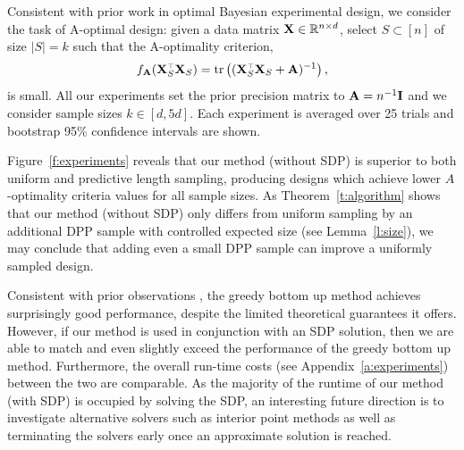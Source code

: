Consistent with prior work \citep{mariet2017elementary,chaloner1984optimal}
in optimal Bayesian experimental design,
we consider the task of A-optimal design:
given a data matrix $\mathbf X \in \mathbb R^{n \times d}$, select
$S \subset [n]$ of size $\lvert S \rvert = k$ such that
the A-optimality
criterion,
\[f_{\A}(\X_S^\top \X_S) = \tr \left((\X_S^\top \X_S + \A)^{-1}\right),\]
is small.
All our experiments set the prior precision matrix to $\mathbf A = n^{-1} \mathbf I$
and we consider sample sizes $k \in [d, 5d]$.
Each experiment is averaged over 25 trials and bootstrap 95\% confidence
intervals are shown.

Figure~\ref{f:experiments} reveals that our method (without SDP) is superior
to both uniform and predictive length sampling, producing designs which
achieve lower $A$-optimality criteria values for all sample sizes.
As Theorem~\ref{t:algorithm} shows that our method (without SDP) only differs
from uniform sampling by an additional DPP sample with controlled
expected size (see Lemma~\ref{l:size}), we may conclude
that adding even a small DPP sample can improve a uniformly sampled design.

Consistent with prior observations
\citep{chamon2017approximate,tractable-experimental-design}, the greedy bottom up
method achieves surprisingly good performance, despite the limited
theoretical guarantees it offers. However, if our method is used
in conjunction with an SDP solution, then we are able to match and
even slightly exceed the performance of the greedy bottom up
method. Furthermore, the overall run-time costs (see Appendix~\ref{a:experiments})
between the two are comparable. As the majority of the runtime of our
method (with SDP) is occupied by solving the SDP, an interesting future direction
is to investigate alternative solvers such as interior point methods as well
as terminating the solvers early once an approximate solution is reached.

